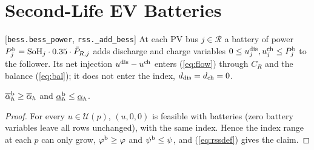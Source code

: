 \section{Second-Life EV Batteries}
\label{app:bess}
[\texttt{bess.bess\_power}, \texttt{rss.\_add\_bess}] At each PV bus $j\in\mathcal R$ a battery of
power $P^{\rm b}_j=\mathrm{SoH}_j\cdot0.35\cdot\bar P_{R,j}$ adds discharge and charge variables
$0\le u^{\rm dis}_j,u^{\rm ch}_j\le P^{\rm b}_j$ to the follower. Its net injection
$u^{\rm dis}-u^{\rm ch}$ enters (\ref{eq:flow}) through $C_R$ and the balance (\ref{eq:bal});
it does not enter the index, $d_{\rm dis}=d_{\rm ch}=0$.
\begin{proposition}\label{prop:bess}
$\overline\alpha^{\rm b}_h\ge\overline\alpha_h$ and $\underline\alpha^{\rm b}_h\le\underline\alpha_h$.
\end{proposition}
\begin{proof}
For every $u\in\mathcal U(p)$, $(u,0,0)$ is feasible with batteries (zero battery
variables leave all rows unchanged), with the same index. Hence the index range at each
$p$ can only grow, $\varphi^{\rm b}\ge\varphi$ and $\psi^{\rm b}\le\psi$, and (\ref{eq:rssdef})
gives the claim.
\end{proof}
